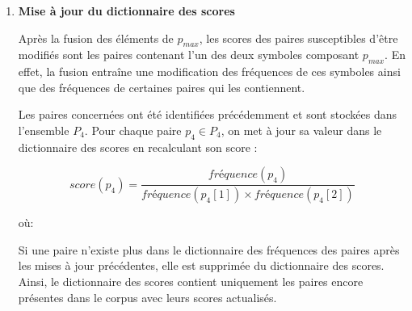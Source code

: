 \documentclass[12pt,a4paper]{report}
\begin{document}
\begin{enumerate}
\begin{enumerate}[label=\alph*)]
\begin{itemizeFB}
				
			\end{itemizeFB}
			
			\item \textbf{Mise à jour du dictionnaire des scores}
			
			Après la fusion des éléments de $p_{max}$, les scores des paires susceptibles d'être modifiés sont les paires contenant l'un des deux symboles composant $p_{max}$. En effet, la fusion entraîne une modification des fréquences de ces symboles ainsi que des fréquences de certaines paires qui les contiennent.
			
			Les paires concernées ont été identifiées précédemment et sont stockées dans l'ensemble $P_4$. Pour chaque paire $p_4 \in P_4$, on met à jour sa valeur dans le dictionnaire des scores en recalculant son score :
			
			\[
			score(p_4)=\frac{fréquence(p_4)}
			{fréquence(p_4[1]) \times fréquence(p_4[2])}
			\]
			
			où:
			
			
			Si une paire n'existe plus dans le dictionnaire des fréquences des paires après les mises à jour précédentes, elle est supprimée du dictionnaire des scores. Ainsi, le dictionnaire des scores contient uniquement les paires encore présentes dans le corpus avec leurs scores actualisés.
			

\end{enumerate}
\end{enumerate}
\end{document}
